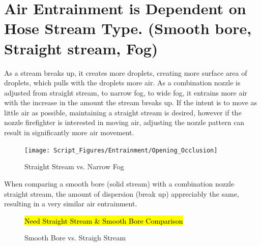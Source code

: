 \documentclass[12pt,oneside]{book}
\begin{document}
\section{Air Entrainment is Dependent on Hose Stream Type. (Smooth bore, Straight stream, Fog)} 
As a stream breaks up, it creates more droplets, creating more surface area of droplets, which pulls with the droplets more air. As a combination nozzle is adjusted from straight stream, to narrow fog, to wide fog, it entrains more air with the increase in the amount the stream breaks up. If the intent is to move as little air as possible, maintaining a straight stream is desired, however if the nozzle firefighter is interested in moving air, adjusting the nozzle pattern can result in significantly more air movement.

\begin{figure}[!ht]
\centering
\texttt{[image: Script\_Figures/Entrainment/Opening\_Occlusion]}
\caption{Straight Stream vs. Narrow Fog}
\label{fig:StraightStream_Fog_Comp}
\end{figure}

When comparing a smooth bore (solid stream) with a combination nozzle straight stream, the amount of dispersion (break up) appreciably the same, resulting in a very similar air entrainment. 

\begin{figure}[!ht]
\centering
\hl{Need Straight Stream \& Smooth Bore Comparison}
\caption{Smooth Bore vs. Straigh Stream}
\label{fig:SB_vs_StraightStream}
\end{figure}




\end{document}
